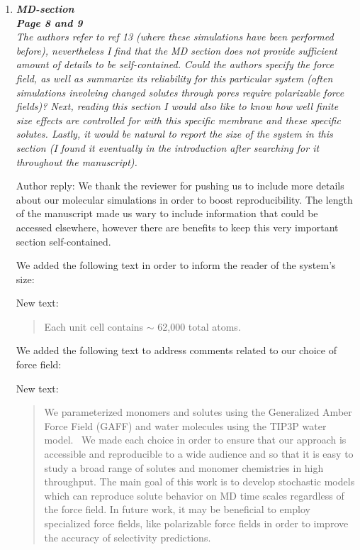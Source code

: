 \documentclass{article}
\begin{document}
\begin{enumerate}[label={Comment \theenumi :}, leftmargin=3.9\parindent]
  \item \textit{\textbf{MD-section} \\
        \textbf{Page 8 and 9} \\
        The authors refer to ref 13 (where these simulations have been performed before), 
        nevertheless I find that the MD section does not provide sufficient amount of details 
        to be self-contained. Could the authors specify the force field, as well as summarize 
        its reliability for this particular system (often simulations involving changed solutes
        through pores require polarizable force fields)? Next, reading this section I would 
        also like to know how well finite size effects are controlled for with this specific 
        membrane and these specific solutes. Lastly, it would be natural to report the size 
        of the system in this section (I found it eventually in the introduction after 
        searching for it throughout the manuscript).}

  Author reply: We thank the reviewer for pushing us to include more details about our 
  molecular simulations in order to boost reproducibility. The length of the manuscript made
  us wary to include information that could be accessed elsewhere, however there are 
  benefits to keep this very important section self-contained.
  
  We added the following text in order to inform the reader of the system's size:
  
  New text:
  \begin{quote}
  Each unit cell contains $\sim$ 62,000 total atoms. %
  \end{quote}
  
  We added the following text to address comments related to our choice of force field:
  
  New text:
  \begin{quote}
  We parameterized monomers and solutes using the Generalized Amber Force Field (GAFF) and
  water molecules using the TIP3P water model.~\cite{} We made each choice in order to
  ensure that our approach is accessible and reproducible to a wide audience and so that
  it is easy to study a broad range of solutes and monomer chemistries in high throughput. 
  The main goal of this work is to develop stochastic models which can reproduce solute
  behavior on MD time scales regardless of the force field. In future work, it may be 
  beneficial to employ specialized force fields, like polarizable force fields in 
  order to improve the accuracy of selectivity predictions.
  \end{quote}
  

\end{enumerate}
\end{document}
